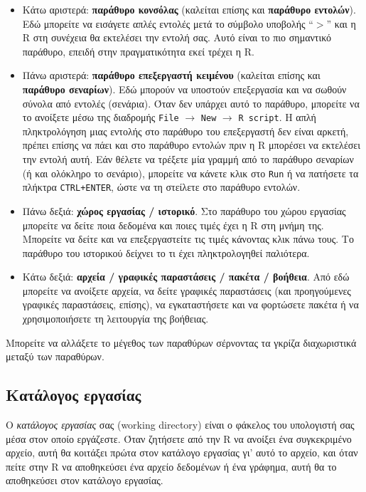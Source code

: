 \documentclass[a4paper,10pt,twocolumn]{article}
\begin{document}
\begin{itemize}
\item Κάτω αριστερά: \textbf{παράθυρο κονσόλας} (καλείται επίσης και \textbf{παράθυρο εντολών}).
Εδώ μπορείτε να εισάγετε απλές εντολές μετά το σύμβολο υποβολής ``$>$'' και η R στη συνέχεια θα εκτελέσει
την εντολή σας. Αυτό είναι το πιο σημαντικό παράθυρο, επειδή στην πραγματικότητα εκεί τρέχει η R.
\item Πάνω αριστερά: \textbf{παράθυρο επεξεργαστή κειμένου} (καλείται επίσης και
\textbf{παράθυρο σεναρίων}). Εδώ μπορούν να υποστούν επεξεργασία και να σωθούν σύνολα από εντολές (σενάρια).
Όταν δεν υπάρχει αυτό το παράθυρο, μπορείτε να το ανοίξετε μέσω της διαδρομής \texttt{File} $\rightarrow$
\texttt{New} $\rightarrow$ \texttt{R script}. Η απλή πληκτρολόγηση μιας εντολής στο παράθυρο του επεξεργαστή
δεν είναι αρκετή, πρέπει επίσης να πάει και στο παράθυρο εντολών πριν η R μπορέσει να εκτελέσει την εντολή αυτή.
Εάν θέλετε να τρέξετε μία γραμμή από το παράθυρο σεναρίων (ή και ολόκληρο το σενάριο), μπορείτε να κάνετε κλικ
στο \texttt{Run} ή να πατήσετε τα πλήκτρα \texttt{CTRL+ENTER}, ώστε να τη στείλετε στο παράθυρο εντολών. 
\item Πάνω δεξιά: \textbf{χώρος εργασίας / ιστορικό}. Στο παράθυρο του χώρου εργασίας
μπορείτε να δείτε ποια δεδομένα και ποιες τιμές έχει η R στη μνήμη της. Μπορείτε να δείτε και να επεξεργαστείτε
τις τιμές κάνοντας κλικ πάνω τους. Το παράθυρο του ιστορικού δείχνει το τι έχει πληκτρολογηθεί παλιότερα. 
\item Κάτω δεξιά: \textbf{αρχεία / γραφικές παραστάσεις / πακέτα / βοήθεια}. Από εδώ μπορείτε να ανοίξετε
αρχεία, να δείτε γραφικές παραστάσεις (και προηγούμενες γραφικές παραστάσεις, επίσης), να εγκαταστήσετε
και να φορτώσετε πακέτα ή να χρησιμοποιήσετε τη λειτουργία της βοήθειας.
\end{itemize}

Μπορείτε να αλλάξετε το μέγεθος των παραθύρων σέρνοντας τα γκρίζα διαχωριστικά μεταξύ των παραθύρων.

\subsection{Κατάλογος εργασίας}

Ο \emph{κατάλογος εργασίας} σας (working directory) είναι ο φάκελος του υπολογιστή σας μέσα στον οποίο
εργάζεστε. Όταν ζητήσετε από την R να ανοίξει ένα συγκεκριμένο αρχείο, αυτή θα κοιτάξει πρώτα στον κατάλογο
εργασίας γι' αυτό το αρχείο, και όταν πείτε στην R να αποθηκεύσει ένα αρχείο δεδομένων ή ένα γράφημα, αυτή
θα το αποθηκεύσει στον κατάλογο εργασίας.
\end{document}
